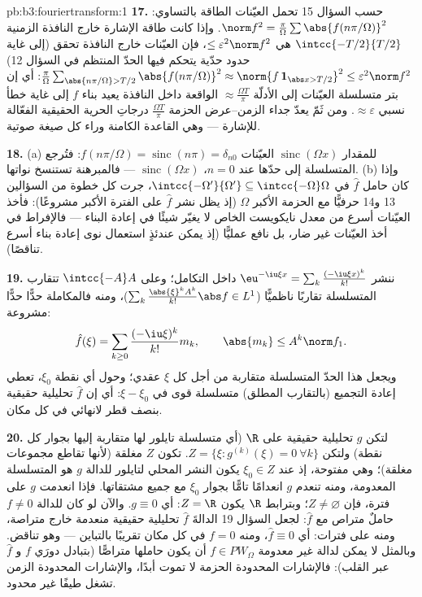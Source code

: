 \begin{solution}{pb:b3:fouriertransform:1}
\textbf{17.} حسب السؤال 15 تحمل العيّنات الطاقة بالتساوي:
$\norm f^2 = \frac\pi\Omega\sum
\abs{f(n\pi/\Omega)}^2$. وإذا كانت طاقة الإشارة خارج النافذة الزمنية $\intcc{-T/2}{T/2}$
هي $\leq \varepsilon^2\norm
f^2$، فإن العيّنات خارج النافذة تحقق (إلى غاية حدود حدّية
يتحكم فيها الحدّ المنتظم في السؤال 12) $\frac\pi\Omega\sum_{\abs{n\pi/\Omega} > T/2}
\abs{f(n\pi/\Omega)}^2 \approx \norm{f\,\mathbf 1_{\abs x >
T/2}}^2 \leq \varepsilon^2\norm f^2$: أي إن بتر
متسلسلة العيّنات إلى الأدلّة $\approx \frac{\Omega T}\pi$ الواقعة داخل النافذة يعيد
بناء $f$ إلى غاية خطأ نسبي $\approx\varepsilon$. ومن ثَمّ يعدّ جداء
الزمن--عرض الحزمة $\frac{\Omega T}{\pi}$ درجاتِ الحرية الحقيقية الفعّالة
للإشارة --- وهي القاعدة الكامنة وراء كل صيغة صوتية.

\textbf{18.} (a) للمقدار $\operatorname{sinc}(\Omega x)$ العيّنات $f(n\pi/\Omega) = \operatorname{sinc}(n\pi) =
\delta_{n0}$: فتُرجع
المتسلسلة إلى حدّها عند $n = 0$، $\operatorname{sinc}(\Omega x)$ --- فالمبرهنة تستنسخ
نواتها. (b) وإذا كان حامل $\hat f$ في $\intcc{-\Omega'}{\Omega'} \subseteq
\intcc{-\Omega}\Omega$، جرت كل خطوة من
السؤالين 13 و14 حرفيًّا مع الحزمة الأكبر $\Omega$ (إذ يظل نشر
$\hat f$ على الفترة الأكبر مشروعًا): فأخذ العيّنات أسرع من معدل
نايكويست الخاص لا يغيّر شيئًا في إعادة البناء --- فالإفراط في
أخذ العيّنات غير ضار، بل نافع عمليًّا (إذ يمكن عندئذٍ استعمال
نوى إعادة بناء أسرع تناقصًا).

\textbf{19.} ننشر $\eu^{-\iu\xi x} =
\sum_k\frac{(-\iu\xi x)^k}{k!}$ داخل التكامل؛ وعلى $\intcc{-A}A$
تتقارب المتسلسلة تقاربًا ناظميًّا ($\sum_k\frac{\abs{\xi}^kA^k}{k!}\abs f \in L^1$)، ومنه فالمكاملة
حدًّا حدًّا مشروعة:
\[
\hat f(\xi) = \sum_{k\geq0}\frac{(-\iu\xi)^k}{k!}m_k,
\qquad \abs{m_k} \leq A^k\norm f_1 .
\]
ويجعل هذا الحدّ المتسلسلة متقاربة من أجل كل $\xi$ عقدي؛ وحول
أي نقطة $\xi_0$، تعطي إعادة التجميع (بالتقارب المطلق) متسلسلة
قوى في $\xi - \xi_0$: أي إن $\hat f$ تحليلية حقيقية بنصف قطر
لانهائي في كل مكان.

\textbf{20.} لتكن $g$ تحليلية حقيقية على $\R$ (أي متسلسلة
تايلور لها متقاربة إليها بجوار كل نقطة) ولتكن $Z = \{\xi :
g^{(k)}(\xi) = 0\ \forall k\}$. تكون $Z$
مغلقة (لأنها تقاطع مجموعات مغلقة)؛ وهي مفتوحة، إذ عند
$\xi_0 \in Z$ يكون النشر المحلي لتايلور للدالة $g$ هو المتسلسلة
المعدومة، ومنه تنعدم $g$ انعدامًا تامًّا بجوار $\xi_0$ مع جميع
مشتقاتها. فإذا انعدمت $g$ على فترة، فإن $Z \neq \varnothing$؛ وبترابط $\R$
يكون $Z = \R$: أي $g \equiv 0$. والآن لو كان للدالة $f
\neq 0$ حاملٌ
متراص مع $\hat f$: لجعل السؤال 19 الدالةَ $\hat f$ تحليلية
حقيقية منعدمة خارج متراصة، ومنه على فترات: أي $\hat f \equiv 0$، ومنه
$f = 0$ في كل مكان تقريبًا بالتباين --- وهو تناقض. وبالمثل لا
يمكن لدالة غير معدومة $f \in
PW_\Omega$ أن يكون حاملها متراصًّا (بتبادل
دورَي $f$ و $\hat f$ عبر القلب): فالإشارات المحدودة الحزمة لا
تموت أبدًا، والإشارات المحدودة الزمن تشغل طيفًا غير محدود.


\end{solution}
